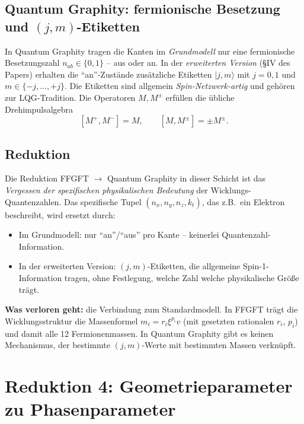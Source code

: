 \subsection{Quantum Graphity: fermionische Besetzung und $(j, m)$-Etiketten}

In Quantum Graphity tragen die Kanten im \emph{Grundmodell} nur eine
fermionische Besetzungszahl $n_{ab} \in \{0, 1\}$ -- aus oder an. In
der \emph{erweiterten Version} (§IV des Papers) erhalten die
\enquote{an}-Zustände zusätzliche Etiketten $|j, m\rangle$ mit
$j = 0, 1$ und $m \in \{-j, \ldots, +j\}$. Die Etiketten sind
allgemein \emph{Spin-Netzwerk-artig} und gehören zur
LQG-Tradition. Die Operatoren $M, M^\pm$ erfüllen die übliche
Drehimpulsalgebra
\[
  [M^+, M^-] = M, \qquad [M, M^\pm] = \pm M^\pm.
\]

\subsection{Reduktion}

Die Reduktion FFGFT $\to$ Quantum Graphity in dieser Schicht ist
das \emph{Vergessen der spezifischen physikalischen Bedeutung} der
Wicklungs-Quantenzahlen. Das spezifische Tupel
$(n_x, n_y, n_z, k_t)$, das z.B.\ ein Elektron beschreibt, wird
ersetzt durch:
\begin{itemize}[leftmargin=2em,itemsep=2pt,topsep=2pt]
  \item Im Grundmodell: nur \enquote{an}/\enquote{aus} pro Kante --
        keinerlei Quantenzahl-Information.
  \item In der erweiterten Version: $(j, m)$-Etiketten, die
        allgemeine Spin-1-Information tragen, ohne Festlegung,
        welche Zahl welche physikalische Größe trägt.
\end{itemize}

\textbf{Was verloren geht:} die Verbindung zum Standardmodell. In
FFGFT trägt die Wicklungsstruktur die Massenformel
$m_i = r_i \xi^{p_i} v$ (mit gesetzten rationalen $r_i$, $p_i$) und
damit alle 12 Fermionenmassen. In
Quantum Graphity gibt es keinen Mechanismus, der bestimmte
$(j, m)$-Werte mit bestimmten Massen verknüpft.

\section{Reduktion 4: Geometrieparameter zu Phasenparameter}

